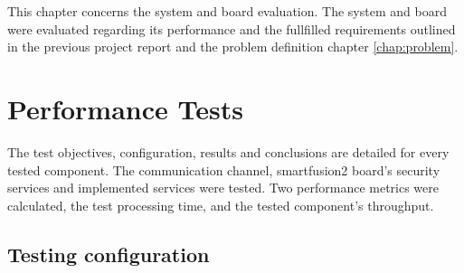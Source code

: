 \cleardoublepage
\label{chap:evaluation}

This chapter concerns the system and board evaluation. The system and board were evaluated regarding its performance and the fullfilled requirements outlined in the previous project report and the problem definition chapter \ref{chap:problem}.
\section{Performance Tests}\label{chap:evaluation:performance}

The test objectives, configuration, results and conclusions are detailed for every tested component.
The communication channel, smartfusion2 board's security services and implemented services were tested.
Two performance metrics were calculated, the test processing time, and the tested component's throughput.

\subsection{Testing configuration}\label{chap:evaluation:performance:config}

